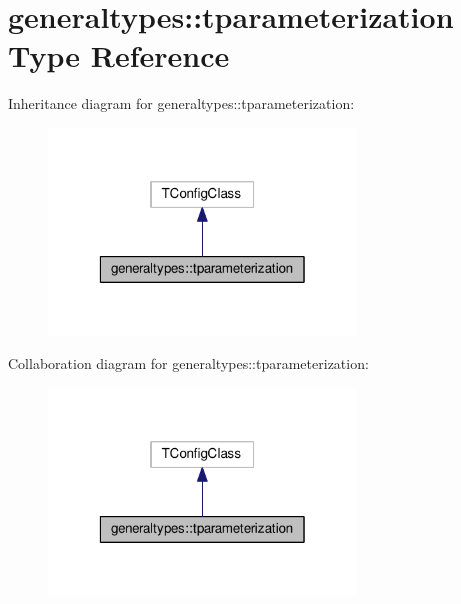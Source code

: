 \hypertarget{structgeneraltypes_1_1tparameterization}{}\section{generaltypes\+:\+:tparameterization Type Reference}
\label{structgeneraltypes_1_1tparameterization}


Inheritance diagram for generaltypes\+:\+:tparameterization\+:
\nopagebreak
\begin{figure}[H]
\begin{center}
\leavevmode
\includegraphics[width=232pt]{structgeneraltypes_1_1tparameterization__inherit__graph}
\end{center}
\end{figure}


Collaboration diagram for generaltypes\+:\+:tparameterization\+:
\nopagebreak
\begin{figure}[H]
\begin{center}
\leavevmode
\includegraphics[width=232pt]{structgeneraltypes_1_1tparameterization__coll__graph}
\end{center}
\end{figure}
